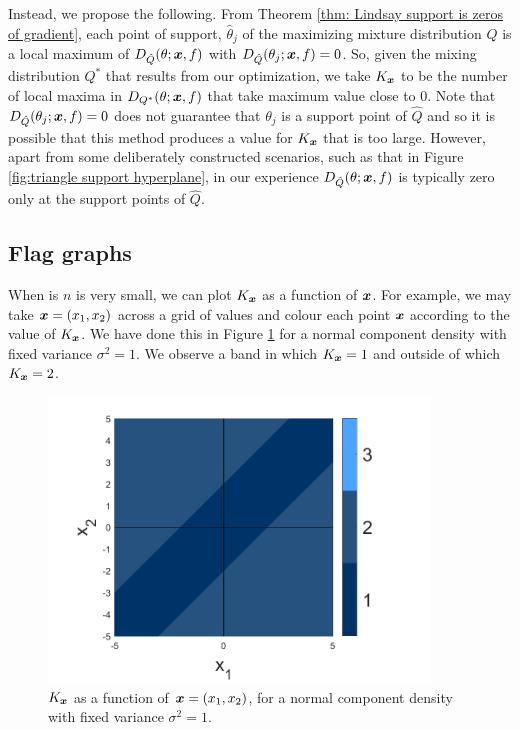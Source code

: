 	Instead, we propose the following. From Theorem \ref{thm: Lindsay support is zeros of gradient}, each point of support, $\hat{\theta}_j$ of the maximizing mixture distribution $\hat{Q}$ is a local maximum of $D_{\hat{Q}}(\theta;{\bm{{x}}}, f)$ with $D_{\hat{Q}}(\theta_j;{\bm{{x}}},f) = 0$. So, given the mixing distribution $Q^*$ that results from our optimization, we take $K_{\bm{{x}}}$ to be the number of local maxima in $D_{Q^*}(\theta;{\bm{{x}}}, f)$ that take maximum value close to $0$. Note that $D_{\hat{Q}}(\theta_j; {\bm{{x}}}, f) = 0$ does not guarantee that $\theta_j$ is a support point of $\hat{Q}$ and so it is possible that this method produces a value for $K_{\bm{{x}}}$ that is too large. However, apart from some deliberately constructed scenarios, such as that in Figure \ref{fig:triangle support hyperplane}, in our experience $D_{\hat{Q}}(\theta;{\bm{{x}}}, f)$ is typically zero only at the support points of $\hat{Q}$.



	\subsection{Flag graphs}
	\label{sec: flag graphs}
	When is $n$ is very small, we can plot $K_{\bm{{x}}}$ as a function of ${\bm{{x}}}$. For example, we may take ${\bm{{x}}} = (x_1, x_2)$ across a grid of values and colour each point ${\bm{{x}}}$ according to the value of $K_{\bm{{x}}}$. We have done this in Figure \ref{fig:normal_flag_graph_n2} for a normal component density with fixed variance $\sigma^2 = 1$. We observe a band in which $K_{\bm{{x}}} = 1$ and outside of which $K_{\bm{{x}}} = 2$.

	\begin{figure}
		\centering
		\includegraphics[width = 0.9\textwidth]{Figures/Mixtures/normal_flag_graph_n2.png}
		\caption{$K_{\bm{{x}}}$ as a function of ${\bm{{x}}} = (x_1, x_2)$, for a normal component density with fixed variance $\sigma^2 = 1$.}
		\label{fig:normal_flag_graph_n2}
	\end{figure}

